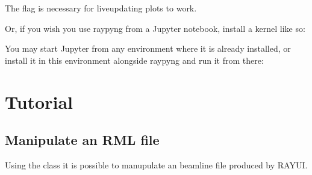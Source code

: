 \documentclass[letterpaper,10pt,english]{sphinxmanual}
\begin{document}
\begin{itemize}
\begin{sphinxVerbatim}[commandchars=\\\{\}]
 
\end{sphinxVerbatim}

\sphinxAtStartPar
The flag  is necessary for live\sphinxhyphen{}updating plots to work.

\sphinxAtStartPar
Or, if you wish you use raypyng from a Jupyter notebook, install a kernel like
so:

\begin{sphinxVerbatim}[commandchars=\\\{\}]
      
\end{sphinxVerbatim}

\sphinxAtStartPar
You may start Jupyter from any environment where it is already installed, or
install it in this environment alongside raypyng and run it from there:

\begin{sphinxVerbatim}[commandchars=\\\{\}]
  
 
\end{sphinxVerbatim}

\end{itemize}

\sphinxstepscope


\chapter{Tutorial}
\label{\detokenize{tutorial:tutorial}}\label{\detokenize{tutorial::doc}}

\section{Manipulate an RML file}
\label{\detokenize{tutorial:manipulate-an-rml-file}}
\sphinxAtStartPar
Using the  class it is possible to manupulate an beamline file produced by RAY\sphinxhyphen{}UI.
\end{document}

